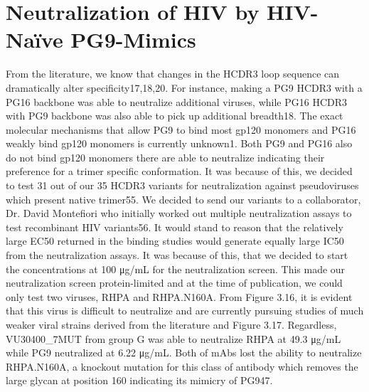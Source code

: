 \section{Neutralization of HIV by HIV-Naïve PG9-Mimics}
From the literature, we know that changes in the HCDR3 loop sequence can dramatically alter specificity17,18,20. For instance, making a PG9 HCDR3 with a PG16 backbone was able to neutralize additional viruses, while PG16 HCDR3 with PG9 backbone was also able to pick up additional breadth18.
The exact molecular mechanisms that allow PG9 to bind most gp120 monomers and PG16 weakly bind gp120 monomers is currently unknown1. Both PG9 and PG16 also do not bind gp120 monomers there are able to neutralize indicating their preference for a trimer specific conformation. It was because of this, we decided to test 31 out of our 35 HCDR3 variants for neutralization against pseudoviruses which present native trimer55. We decided to send our variants to a collaborator, Dr. David Montefiori who initially worked out multiple neutralization assays to test recombinant HIV variants56.
It would stand to reason that the relatively large EC50 returned in the binding studies would generate equally large IC50 from the neutralization assays. It was because of this, that we decided to start the concentrations at 100 μg/mL for the neutralization screen. This made our neutralization screen protein-limited and at the time of publication, we could only test two viruses, RHPA and RHPA.N160A. From Figure 3.16, it is evident that this virus is difficult to neutralize and are currently pursuing studies of much weaker viral strains derived from the literature and Figure 3.17. Regardless, VU30400_7MUT from group G was able to neutralize RHPA at 49.3 μg/mL while PG9 neutralized at 6.22 μg/mL. Both of mAbs lost the ability to neutralize RHPA.N160A, a knockout mutation for this class of antibody which removes the large glycan at position 160 indicating its mimicry of PG947.

